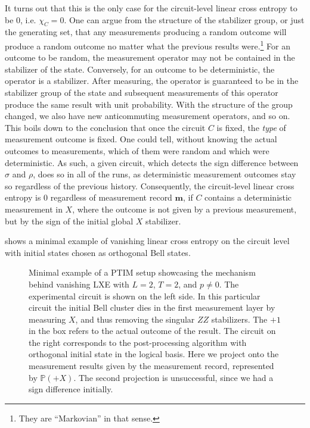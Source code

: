 It turns out that this is the only case for the circuit-level linear cross
entropy to be $0$, i.e. $\chi_C = 0$. One can argue from the structure of the
stabilizer group, or just the generating set, that any measurements producing a
random outcome will produce a random outcome no matter what the previous
results were.\footnote{They are \enquote{Markovian} in that sense.} For an
outcome to be random, the measurement operator may not be contained in the
stabilizer of the state. Conversely, for an outcome to be deterministic, the
operator is a stabilizer. After measuring, the operator is guaranteed to be in
the stabilizer group of the state and subsequent measurements of this operator
produce the same result with unit probability. With the structure of the group
changed, we also have new anticommuting measurement operators, and so on. This
boils down to the conclusion that once the circuit $C$ is fixed, the
\emph{type} of measurement outcome is fixed. One could tell, without knowing
the actual outcomes to measurements, which of them were random and which were
deterministic. As such, a given circuit, which detects the sign difference
between $\sigma$ and $\rho$, does so in all of the runs, as deterministic
measurement outcomes stay so regardless of the previous history. Consequently,
the circuit-level linear cross entropy is $0$ regardless of measurement record
$\mathbf{m}$, if $C$ contains a deterministic measurement in $X$, where the
outcome is not given by a previous measurement, but by the sign of the initial
global $X$ stabilizer.

 shows a minimal example of vanishing linear cross
entropy on the circuit level with initial states chosen as orthogonal Bell
states.

\begin{figure}[t]
  \centering
  
  \caption{Minimal example of a PTIM setup showcasing the mechanism behind
    vanishing LXE with
  $L=2$, $T=2$, and $p\neq 0$. The experimental circuit is shown on the left
  side.  In this particular circuit the initial Bell cluster dies in the first
  measurement layer by measuring $X$, and thus removing the singular $ZZ$
  stabilizers.  The $+1$ in the box refers to the actual outcome of the result.
  The circuit on the right corresponds to the post-processing algorithm with
  orthogonal initial state in the logical basis. Here we project onto the
  measurement results given by the measurement record, represented by
  $\mathbb{P}(+X)$. The second projection is unsuccessful, since we had a sign
  difference initially.}
  \label{fig:mechanism-a}
\end{figure}

